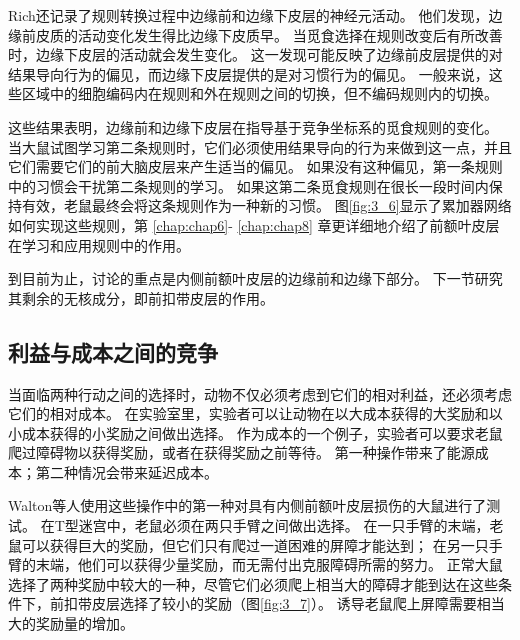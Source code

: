 Rich\cite{rich2009rat}还记录了规则转换过程中边缘前和边缘下皮层的神经元活动。
他们发现，边缘前皮质的活动变化发生得比边缘下皮质早。
当觅食选择在规则改变后有所改善时，边缘下皮层的活动就会发生变化。
这一发现可能反映了边缘前皮层提供的对结果导向行为的偏见，而边缘下皮层提供的是对习惯行为的偏见。
一般来说，这些区域中的细胞编码内在规则和外在规则之间的切换，但不编码规则内的切换。\par


这些结果表明，边缘前和边缘下皮层在指导基于竞争坐标系的觅食规则的变化。
当大鼠试图学习第二条规则时，它们必须使用结果导向的行为来做到这一点，并且它们需要它们的前大脑皮层来产生适当的偏见。
如果没有这种偏见，第一条规则中的习惯会干扰第二条规则的学习。
如果这第二条觅食规则在很长一段时间内保持有效，老鼠最终会将这条规则作为一种新的习惯。
图\ref{fig:3_6}显示了累加器网络如何实现这些规则，第 \ref{chap:chap6}- \ref{chap:chap8} 章更详细地介绍了前额叶皮层在学习和应用规则中的作用。\par


到目前为止，讨论的重点是内侧前额叶皮层的边缘前和边缘下部分。
下一节研究其剩余的无核成分，即前扣带皮层的作用。\par



\subsection{利益与成本之间的竞争}

当面临两种行动之间的选择时，动物不仅必须考虑到它们的相对利益，还必须考虑它们的相对成本。
在实验室里，实验者可以让动物在以大成本获得的大奖励和以小成本获得的小奖励之间做出选择。
作为成本的一个例子，实验者可以要求老鼠爬过障碍物以获得奖励\cite{salamone1997behavioral}，或者在获得奖励之前等待\cite{cardinal2001impulsive}。
第一种操作带来了能源成本；第二种情况会带来延迟成本。\par


Walton等人\cite{walton2003functional}使用这些操作中的第一种对具有内侧前额叶皮层损伤的大鼠进行了测试。
在T型迷宫中，老鼠必须在两只手臂之间做出选择。
在一只手臂的末端，老鼠可以获得巨大的奖励，但它们只有爬过一道困难的屏障才能达到；
在另一只手臂的末端，他们可以获得少量奖励，而无需付出克服障碍所需的努力。
正常大鼠选择了两种奖励中较大的一种，尽管它们必须爬上相当大的障碍才能到达在这些条件下，前扣带皮层选择了较小的奖励（图\ref{fig:3_7}）。
诱导老鼠爬上屏障需要相当大的奖励量的增加\cite{walton2002role}。\par


